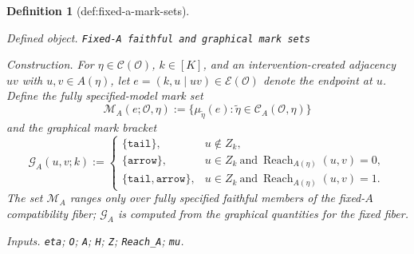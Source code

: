 \documentclass{article}
\newtheorem{definition}{Definition}
\begin{document}
\begin{definition}[def:fixed-a-mark-sets]\label{def:fixed-a-mark-sets}
\par\smallskip\noindent\emph{Defined object.} \texttt{Fixed-\allowbreak{}A faithful and graphical mark sets}
\par\smallskip\noindent\emph{Construction.} For \(\eta\in\mathcal C(\mathcal O)\), \(k\in[K]\), and an intervention-created adjacency \(uv\) with \(u,v\in A(\eta)\), let \(e=(k,u\mid uv)\in\mathcal E(\mathcal O)\) denote the endpoint at \(u\). Define the fully specified-model mark set
\[
 \mathcal M_A(e;\mathcal O,\eta)
 :=\{\mu_{\widetilde\eta}(e):
       \widetilde\eta\in\mathcal C_A(\mathcal O,\eta)\}
\]
and the graphical mark bracket
\[
 \mathcal G_A(u,v;k):=
 \begin{cases}
 \{\mathtt{tail}\},
   &u\notin Z_k,\\
 \{\mathtt{arrow}\},
   &u\in Z_k\ \text{and}\
     \operatorname{Reach}_{A(\eta)}(u,v)=0,\\
 \{\mathtt{tail},\mathtt{arrow}\},
   &u\in Z_k\ \text{and}\
     \operatorname{Reach}_{A(\eta)}(u,v)=1.
 \end{cases}
\]
The set \(\mathcal M_A\) ranges only over fully specified faithful members of the fixed-\(A\) compatibility fiber; \(\mathcal G_A\) is computed from the graphical quantities for the fixed fiber.
\par\smallskip\noindent\emph{Inputs.} \texttt{eta}; \texttt{O}; \texttt{A}; \texttt{H}; \texttt{Z}; \texttt{Reach\_\allowbreak{}A}; \texttt{mu}.
\end{definition}
\end{document}
